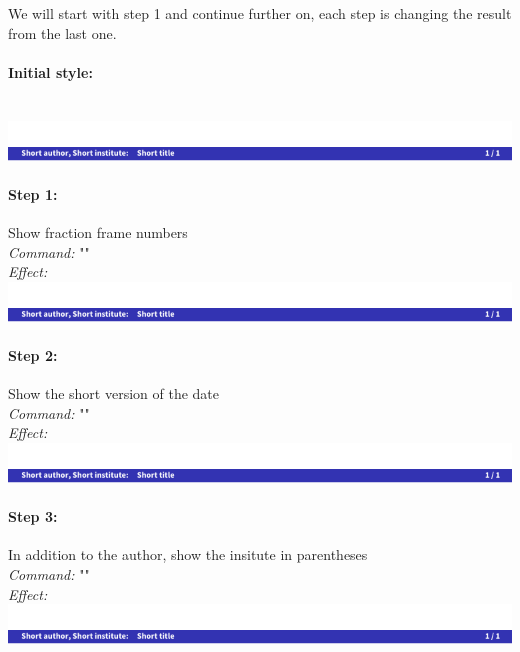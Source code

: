 \documentclass[11pt]{ltxdoc}
\begin{document}
	\medskip
	We will start with step 1 and continue further on, each step is changing the result from the last one.
	
	\paragraph{Initial style:}~ \\
	\includegraphics[page=4, width=\textwidth, trim=0 0 0 15, clip]{hackthefootline-examples}
	
	\paragraph{Step 1:} Show fraction frame numbers \\
	\textit{Command:} "" \\
	\textit{Effect:} \\
	\includegraphics[page=5, width=\textwidth, trim=0 0 0 15, clip]{hackthefootline-examples}
	
	\paragraph{Step 2:} Show the short version of the date \\
	\textit{Command:} "" \\
	\textit{Effect:} \\
	\includegraphics[page=6, width=\textwidth, trim=0 0 0 15, clip]{hackthefootline-examples}
	
	\paragraph{Step 3:} In addition to the author, show the insitute in parentheses \\
	\textit{Command:} "" \\
	\textit{Effect:} \\
	\includegraphics[page=7, width=\textwidth, trim=0 0 0 15, clip]{hackthefootline-examples}
	
\end{document}
